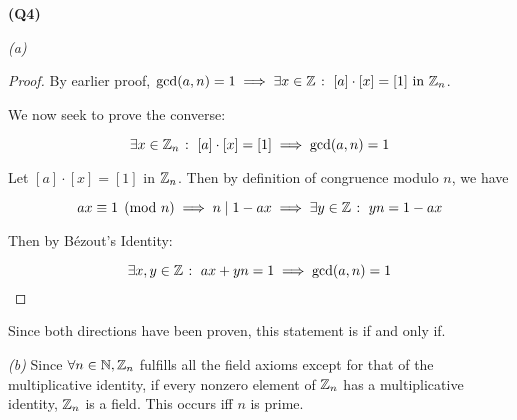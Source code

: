 \documentclass[12pt, a4paper]{article}
\newcommand{\divs}{\;|\;}
\begin{document}
\textbf{(Q4)}

\textit{(a)}

\begin{proof}
    By earlier proof, 
    $\gcd (a, n) = 1 \implies \exists x \in \mathbb{Z} 
    \; \colon \; [a] \cdot [x] = [1] \text{ in } \mathbb{Z}_n$.

    We now seek to prove the converse:

    \[
        \exists x \in \mathbb{Z}_n \; \colon \; [a] \cdot [x] = [1] \implies
        \gcd (a, n) = 1
    \]

    Let $[a] \cdot [x] = [1]$ in $\mathbb{Z}_n$. Then by definition of 
    congruence modulo $n$, we have
    
    \[
        ax \equiv 1 \pmod n \implies n \divs 1 - ax
        \implies \exists y \in \Z \st yn = 1 - ax
    \]

    Then by B\'{e}zout's Identity:

    \[
        \exists x, y \in \mathbb{Z} \; \colon \; ax + yn = 1 \implies \gcd (a, n) = 1
    \]
\end{proof}

Since both directions have been proven, this statement is if and only if.

\textit{(b)} Since $\forall n \in \mathbb{N}, \mathbb{Z}_{n}$ fulfills all the field axioms
except for that of the multiplicative identity, if every nonzero element of
$\mathbb{Z}_n$ has a multiplicative identity, $\mathbb{Z}_n$ is a field. This occurs iff
$n$ is prime.
\end{document}
